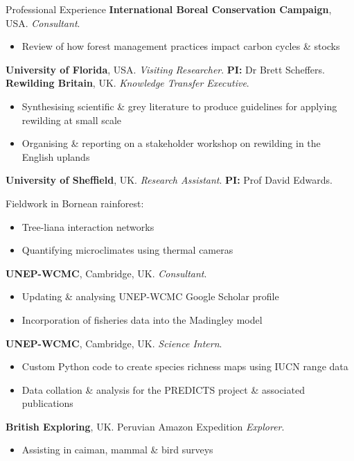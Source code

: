 \renewcommand\labelitemi{$\diamond$}

\begin{rubric}{Professional Experience}
\entry*[2020]%
	\textbf{International Boreal Conservation Campaign}, USA. \emph{Consultant}.
	\begin{itemize}[topsep=0pt,itemsep=-1ex,partopsep=1ex,parsep=1ex]
	\item Review of how forest management practices impact carbon cycles \& stocks
	\end{itemize}
\entry*[2019]%
	\textbf{University of Florida}, USA. \emph{Visiting Researcher}. \textbf{PI:} Dr Brett Scheffers.
\entry*[2016]%
	\textbf{Rewilding Britain}, UK. \emph{Knowledge Transfer Executive}.
	\begin{itemize}[topsep=0pt,itemsep=-1ex,partopsep=1ex,parsep=1ex]
	\item Synthesising scientific \& grey literature to produce guidelines for applying rewilding at small scale
	\item Organising \& reporting on a stakeholder workshop on rewilding in the English uplands \parencite{sandom_rewilding_2019}
	\end{itemize}
\entry*[2014]%
	\textbf{University of Sheffield}, UK. \emph{Research Assistant}. \textbf{PI:} Prof David Edwards.
	\par Fieldwork in Bornean rainforest:
	\begin{itemize}[topsep=0pt,itemsep=-1ex,partopsep=1ex,parsep=1ex]
	\item Tree-liana interaction networks \parencite{magrach_selective_2016}
	\item Quantifying microclimates using thermal cameras \parencite{scheffers_extreme_2017}
	\end{itemize}
\entry*[2013 -- 2014]%
	\textbf{UNEP-WCMC}, Cambridge, UK. \emph{Consultant}.
	\begin{itemize}[topsep=0pt,itemsep=-1ex,partopsep=1ex,parsep=1ex]
	\item Updating \& analysing UNEP-WCMC Google Scholar profile
	\item Incorporation of fisheries data into the Madingley model
	\end{itemize}
\entry*[2013]%
	\textbf{UNEP-WCMC}, Cambridge, UK. \emph{Science Intern}.
	\begin{itemize}[topsep=0pt,itemsep=-1ex,partopsep=1ex,parsep=1ex]
	\item Custom Python code to create species richness maps using IUCN range data
	\item  Data collation \& analysis for the PREDICTS project \& associated publications \parencite{newbold_global_2015, hudson_predicts_2014, hudson_database_2017}
	\end{itemize}
\entry*[2011]%
	\textbf{British Exploring}, UK. Peruvian Amazon Expedition \emph{Explorer}.
	\begin{itemize}[topsep=0pt,itemsep=-1ex,partopsep=1ex,parsep=1ex]
	\item Assisting in caiman, mammal \& bird  surveys
	\end{itemize}
\end{rubric}